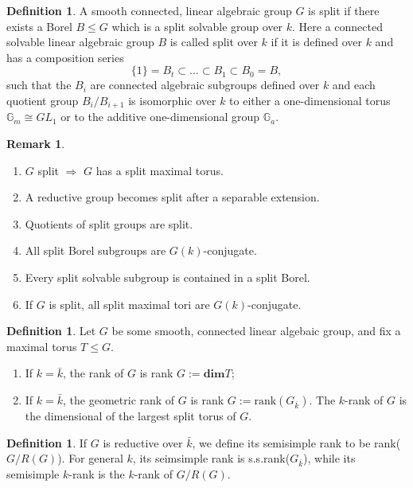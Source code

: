 \documentclass[12pt,a4paper,english]{article}
\theoremstyle{plain}
\theoremstyle{definition}
\newtheorem{defi}[thm]{Definition}
\newtheorem*{rem}{Remark}
\begin{document}
\begin{defi}
A smooth connected, linear algebraic group $G$ is split if there exists a Borel $B\leq G$ which is a split solvable group over $k$. Here a connected solvable linear algebraic group $B$ is called split over $k$ if it is defined over $k$ and has a composition series 
\begin{equation*}
    \{1\}=B_{t}\subset ...\subset B_{1}\subset B_{0}=B,
\end{equation*}
such that the $B_{i}$ are connected algebraic subgroups defined over $k$ and each quotient group $B_{i}/B_{i+1}$ is isomorphic over $k$ to either a one-dimensional torus $\mathbb{G}_{m}\cong GL_{1}$ or to the additive one-dimensional group $\mathbb{G}_{a}$.
\end{defi}
\begin{rem}
\begin{enumerate}
    \item $G$ split $\Rightarrow$ $G$ has a split maximal torus. 
    \item A reductive group becomes split after a separable extension.
    \item Quotients of split groups are split.
    \item All split Borel subgroups are $G(k)$-conjugate.
    \item Every split solvable subgroup is contained in a split Borel.
    \item If $G$ is split, all split maximal tori are $G(k)$-conjugate. 
\end{enumerate}
\end{rem}

\begin{defi}
Let $G$ be some smooth, connected linear algebaic group, and fix a maximal torus $T\leq G$.
\begin{enumerate}
    \item If $k=\bar{k}$, the rank of $G$ is rank $G:=\textbf{dim} T$;
    \item If $k=\bar{k}$, the geometric rank of $G$ is rank $G:= \text{rank}(G_{\bar{k}})$. The $k$-rank of $G$ is the dimensional of the largest split torus of $G$.
\end{enumerate}
\end{defi}

\begin{defi}
If $G$ is reductive over $\bar{k}$, we define its semisimple rank to be rank($G/R(G)$). For general $k$, its seimsimple rank is s.s.rank($G_{\bar{k}}$), while its semisimple $k$-rank is the $k$-rank of $G/R(G)$.
\end{defi}
\end{document}
